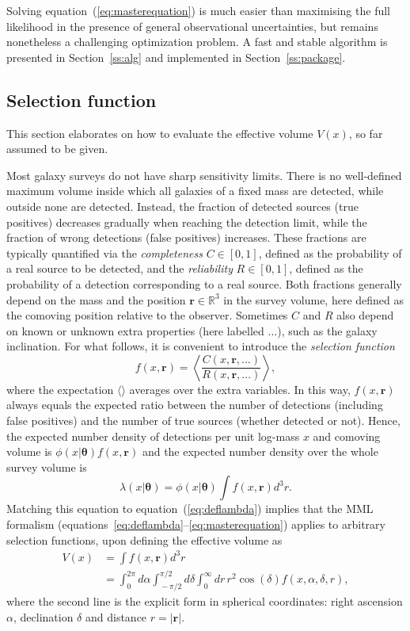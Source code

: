 \documentclass[a4paper,fleqn,usenatbib]{mnras}
\newcommand{\be}{\begin{equation}}
\newcommand{\ee}{\end{equation}}
\renewcommand{\r}{\mathbf{r}}
\newcommand{\veff}{V}%
\newcommand{\eq}[1]{equation~(\ref{eq:#1})}
\renewcommand{\ss}[1]{Section~\ref{ss:#1}}
\newcommand{\para}{{\bm{\theta}}}
\begin{document}
Solving \eq{masterequation} is much easier than maximising the full likelihood in the presence of general observational uncertainties, but remains nonetheless a challenging optimization problem. A fast and stable algorithm is presented in \ss{alg} and implemented in \ss{package}.

\subsection{Selection function}\label{ss:gradual}

This section elaborates on how to evaluate the effective volume $\veff(x)$, so far assumed to be given.

Most galaxy surveys do not have sharp sensitivity limits. There is no well-defined maximum volume  inside which all galaxies of a fixed mass are detected, while outside none are detected. Instead, the fraction of detected sources (true positives) decreases gradually when reaching the detection limit, while the fraction of wrong detections (false positives) increases. These fractions are typically quantified via the \textit{completeness} $C\in[0,1]$, defined as the probability of a real source to be detected, and the \textit{reliability} $R\in[0,1]$, defined as the probability of a detection corresponding to a real source. Both fractions generally depend on the mass and the position $\r\in\mathbb{R}^3$ in the survey volume, here defined as the comoving position relative to the observer. Sometimes $C$ and $R$ also depend on known or unknown extra properties (here labelled $...$), such as the galaxy inclination. For what follows, it is convenient to introduce the \textit{selection function}
%
\be\label{eq:selfct}
	f(x,\r)=\left\langle\frac{C(x,\r,...)}{R(x,\r,...)}\right\rangle,
\ee
%
where the expectation $\langle\rangle$ averages over the extra variables. In this way, $f(x,\r)$ always equals the expected ratio between the number of detections (including false positives) and the number of true sources (whether detected or not). Hence, the expected number density of detections per unit log-mass $x$ and comoving volume is $\phi(x|\para)f(x,\r)$ and the expected number density over the whole survey volume is
%
\be\label{eq:lambdagradual}
	\lambda(x|\para) = \phi(x|\para)\int f(x,\r) d^3r.
\ee
%
Matching this equation to \eq{deflambda} implies that the MML formalism (equations~\ref{eq:deflambda}--\ref{eq:masterequation}) applies to arbitrary selection functions, upon defining the effective volume as
%
\be\label{eq:veffgradual}
\begin{split}
	\veff(x) &= \int f(x,\r)d^3r\\
	& = \int_0^{2\pi}\!\!\!\!\!\!d\alpha\!\int_{\!-\!\pi/2}^{\pi/2}\!\!\!\!\!\!\!\!d\delta\int_0^{\infty}\!\!\!\!\!\!dr\,r^2\!\cos(\delta) f(x,\alpha,\delta,r),
\end{split}
\ee
%
where the second line is the explicit form in spherical coordinates: right ascension $\alpha$, declination $\delta$ and distance $r=|\r|$.
\end{document}
